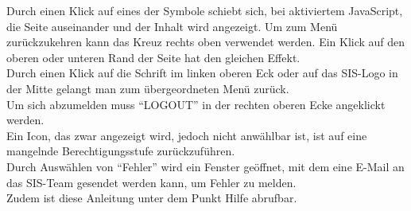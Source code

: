 Durch einen Klick auf eines der Symbole schiebt sich, bei aktiviertem JavaScript, die Seite auseinander und der Inhalt wird angezeigt. Um zum Menü zurückzukehren kann  das Kreuz rechts oben verwendet werden. Ein Klick auf den oberen oder unteren Rand der Seite hat den gleichen Effekt.\\
Durch einen Klick auf die Schrift im linken oberen Eck oder auf das SIS-Logo in der Mitte gelangt man zum übergeordneten Menü zurück.\\
Um sich abzumelden muss \enquote{LOGOUT} in der rechten oberen Ecke angeklickt werden.\\
Ein Icon, das zwar angezeigt wird, jedoch nicht anwählbar ist, ist auf eine mangelnde Berechtigungsstufe zurückzuführen.\\
Durch Auswählen von \enquote{Fehler} wird ein Fenster geöffnet, mit dem eine E-Mail an das SIS-Team gesendet werden kann, um Fehler zu melden.\\
Zudem ist diese Anleitung unter dem Punkt Hilfe abrufbar.